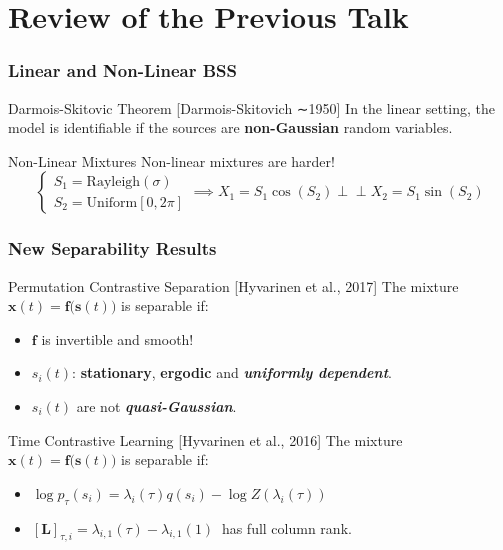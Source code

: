 \documentclass[usenames,dvipsnames]{beamer}
\begin{document}
\section{Review of the Previous Talk}
\begin{frame}
\frametitle{Linear and Non-Linear BSS}
\begin{alertblock}{Darmois-Skitovic Theorem \small{[Darmois-Skitovich ∼1950]}}
In the linear setting, the model is identifiable if the sources are \textbf{non-Gaussian} random variables.
\end{alertblock}
\pause
\begin{exampleblock}{Non-Linear Mixtures}
Non-linear mixtures are harder!
\small{
\begin{equation*}
\begin{cases}

S_1 = \mathrm{Rayleigh}(\sigma)\\
S_2 = \mathrm{Uniform} [0, 2\pi]
\end{cases}
\implies
X_1 = S_1 \cos (S_2) \perp \!\!\! \perp X_2 =  S_1 \sin (S_2)
\end{equation*}
}
\end{exampleblock}
\end{frame}
\normalsize


\begin{frame}
\frametitle{New Separability Results}
	\begin{alertblock}{Permutation Contrastive Separation [\footnotesize{Hyvarinen et al., 2017}]}
The mixture
		$\textbf{x}(t) = \textbf{f}\big(\textbf{s}(t)\big)$ is separable if:
		\begin{itemize}
			\item
			$\textbf{f}$ is invertible and smooth!
			\item
			$s_i(t)$:  \textbf{stationary},  \textbf{ergodic} and  \textbf{ \textit{uniformly dependent}}.
			\item
			$s_i(t)$ are not \textbf{ \textit{quasi-Gaussian}}.		
		\end{itemize}
	\end{alertblock}
	\begin{block}{Time Contrastive Learning \footnotesize[{Hyvarinen et al., 2016}]}
The mixture
$\textbf{x}(t) = \textbf{f}\big(\textbf{s}(t)\big)$ is separable if:
\begin{itemize}
\item
$
	\log p_\tau(s_i)=    \lambda_{i}(\tau) q(s_i) - \log Z( \lambda_{i}(\tau))
	\label{eq:p_tau_simple}
$
\item
$[\mathbf{L}]_{\tau, i} = 
	\lambda_{i, 1}(\tau) - \lambda_{i, 1}(1) \
	$
	has full column rank.
\end{itemize}
\end{block}
\end{frame}
\end{document}
